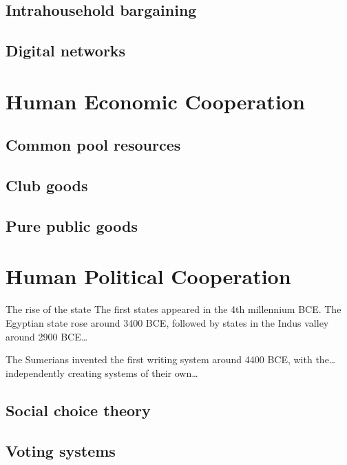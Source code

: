 \documentclass{tufte-book} %
\begin{document}
\section{Intrahousehold bargaining}

\section{Digital networks}


\chapter{Human Economic Cooperation}\label{ch:econ-coop}

\section{Common pool resources}

\section{Club goods}

\section{Pure public goods}


\chapter{Human Political Cooperation}\label{ch:poli-coop}

The rise of the state
The first states appeared in the 4th millennium BCE. The Egyptian state rose around 3400 BCE, followed by states in the Indus valley around 2900 BCE…

The Sumerians invented the first writing system around 4400 BCE, with the…independently creating systems of their own…

\section{Social choice theory}

\section{Voting systems}
\end{document}
